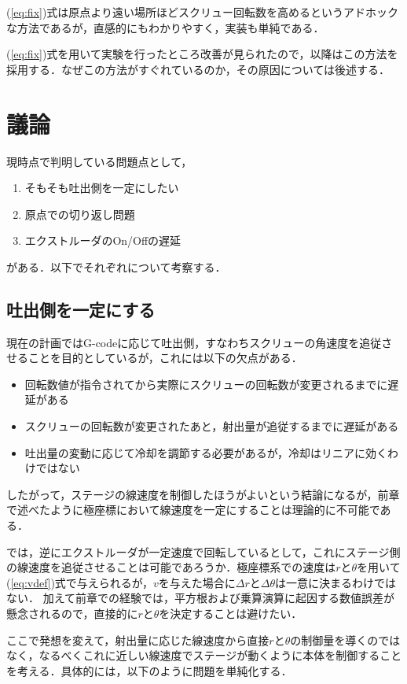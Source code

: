 \documentclass[twocolumn,oneside,a4paper]{article}
\begin{document}
(\ref{eq:fix})式は原点より遠い場所ほどスクリュー回転数を高めるというアドホックな方法であるが，直感的にもわかりやすく，実装も単純である．

(\ref{eq:fix})式を用いて実験を行ったところ改善が見られたので，以降はこの方法を採用する．なぜこの方法がすぐれているのか，その原因については後述する．

\section{議論}
現時点で判明している問題点として，

\begin{enumerate}
	\item そもそも吐出側を一定にしたい
	\item 原点での切り返し問題
	\item エクストルーダのOn/Offの遅延
\end{enumerate}

がある．以下でそれぞれについて考察する．

\subsection{吐出側を一定にする}
現在の計画ではG-codeに応じて吐出側，すなわちスクリューの角速度を追従させることを目的としているが，これには以下の欠点がある．

\begin{itemize}
    \item 回転数値が指令されてから実際にスクリューの回転数が変更されるまでに遅延がある
    \item スクリューの回転数が変更されたあと，射出量が追従するまでに遅延がある
	\item 吐出量の変動に応じて冷却を調節する必要があるが，冷却はリニアに効くわけではない
\end{itemize}

したがって，ステージの線速度を制御したほうがよいという結論になるが，前章で述べたように極座標において線速度を一定にすることは理論的に不可能である．

では，逆にエクストルーダが一定速度で回転しているとして，これにステージ側の線速度を追従させることは可能であろうか．極座標系での速度は$r$と$\theta$を用いて(\ref{eq:vdef})式で与えられるが，$v$を与えた場合に$\Delta r$と$\Delta \theta$は一意に決まるわけではない．
加えて前章での経験では，平方根および乗算演算に起因する数値誤差が懸念されるので，直接的に$r$と$\theta$を決定することは避けたい．

ここで発想を変えて，射出量に応じた線速度から直接$r$と$\theta$の制御量を導くのではなく，なるべくこれに近しい線速度でステージが動くように本体を制御することを考える．具体的には，以下のように問題を単純化する．
\end{document}

